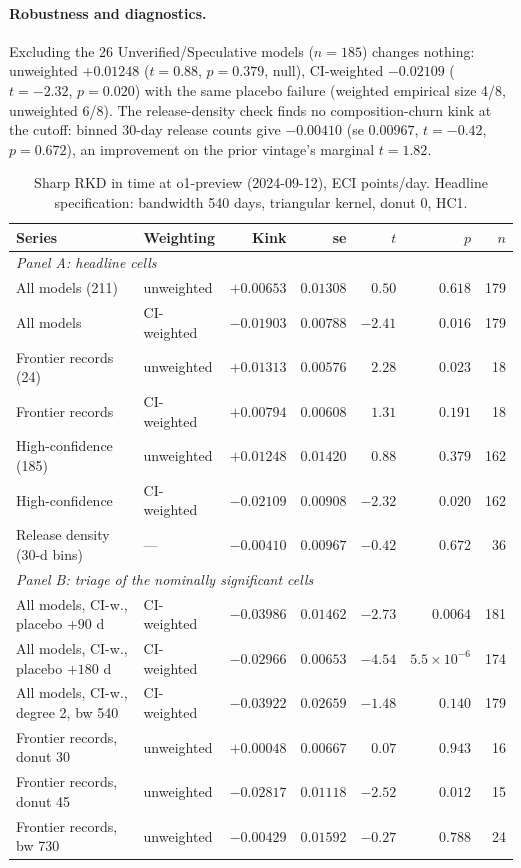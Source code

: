 \documentclass[11pt]{article}
\begin{document}
\paragraph{Robustness and diagnostics.} Excluding the 26
Unverified\slash Speculative models ($n=185$) changes nothing: unweighted
$+0.01248$ ($t=0.88$, $p=0.379$, null), CI-weighted $-0.02109$ ($t=-2.32$,
$p=0.020$) with the same placebo failure (weighted empirical size 4/8,
unweighted 6/8). The release-density check finds no composition-churn kink
at the cutoff: binned 30-day release counts give $-0.00410$ (se $0.00967$,
$t=-0.42$, $p=0.672$), an improvement on the prior vintage's marginal
$t=1.82$.

\begin{table}[t]
\centering
\small
\caption{Sharp RKD in time at o1-preview (2024-09-12), ECI points/day.
Headline specification: bandwidth 540 days, triangular kernel, donut 0, HC1.}
\label{tab:kink}
\setlength{\tabcolsep}{4.5pt}
\begin{tabular}{llrrrrr}
\toprule
Series & Weighting & Kink & se & $t$ & $p$ & $n$ \\
\midrule
\multicolumn{7}{l}{\emph{Panel A: headline cells}}\\
All models (211)            & unweighted  & $+0.00653$ & $0.01308$ & $0.50$  & $0.618$ & 179 \\
All models                  & CI-weighted & $-0.01903$ & $0.00788$ & $-2.41$ & $0.016$ & 179 \\
Frontier records (24)       & unweighted  & $+0.01313$ & $0.00576$ & $2.28$  & $0.023$ & 18 \\
Frontier records            & CI-weighted & $+0.00794$ & $0.00608$ & $1.31$  & $0.191$ & 18 \\
High-confidence (185)       & unweighted  & $+0.01248$ & $0.01420$ & $0.88$  & $0.379$ & 162 \\
High-confidence             & CI-weighted & $-0.02109$ & $0.00908$ & $-2.32$ & $0.020$ & 162 \\
Release density (30-d bins) & ---         & $-0.00410$ & $0.00967$ & $-0.42$ & $0.672$ & 36 \\
\midrule
\multicolumn{7}{l}{\emph{Panel B: triage of the nominally significant cells}}\\
All models, CI-w., placebo $+90$ d  & CI-weighted & $-0.03986$ & $0.01462$ & $-2.73$ & $0.0064$ & 181 \\
All models, CI-w., placebo $+180$ d & CI-weighted & $-0.02966$ & $0.00653$ & $-4.54$ & $5.5\times10^{-6}$ & 174 \\
All models, CI-w., degree 2, bw 540 & CI-weighted & $-0.03922$ & $0.02659$ & $-1.48$ & $0.140$ & 179 \\
Frontier records, donut 30          & unweighted  & $+0.00048$ & $0.00667$ & $0.07$  & $0.943$ & 16 \\
Frontier records, donut 45          & unweighted  & $-0.02817$ & $0.01118$ & $-2.52$ & $0.012$ & 15 \\
Frontier records, bw 730            & unweighted  & $-0.00429$ & $0.01592$ & $-0.27$ & $0.788$ & 24 \\
\bottomrule
\end{tabular}


\end{table}
\end{document}
